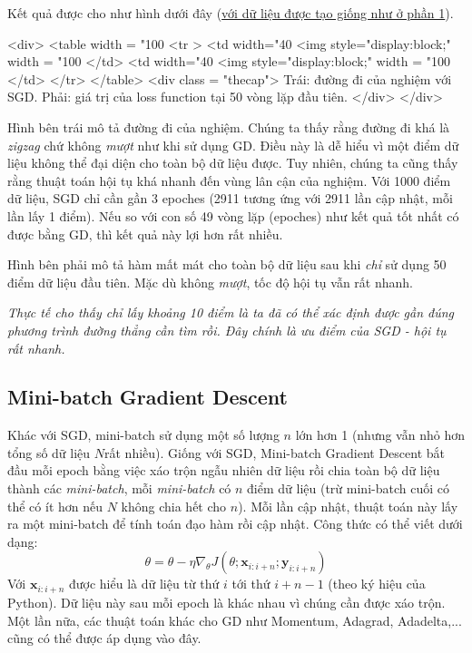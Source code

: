 Kết quả được cho như hình dưới đây (\href{http://machinelearningcoban.com/2017/01/12/gradientdescent/#quay-lai-voi-bai-toan-linear-regression}{với dữ liệu được tạo giống như ở phần 1}). 
 
<div> 
<table width = "100%
   <tr > 
        <td width="40%
        <img style="display:block;" width = "100%
         </td> 
        <td width="40%
        <img style="display:block;" width = "100%
        </td> 
    </tr> 
</table>  
<div class = "thecap"> Trái: đường đi của nghiệm với SGD. Phải: giá trị của loss function tại 50 vòng lặp đầu tiên. </div> 
</div> 
 
Hình bên trái mô tả đường đi của nghiệm. Chúng ta thấy rằng đường đi khá là \textit{zigzag} chứ không \textit{mượt} như khi sử dụng GD. Điều này là dễ hiểu vì một điểm dữ liệu không thể đại diện cho toàn bộ dữ liệu được. Tuy nhiên, chúng ta cũng thấy rằng thuật toán hội tụ khá nhanh đến vùng lân cận của nghiệm. Với 1000 điểm dữ liệu, SGD chỉ cần gần 3 epoches (2911 tương ứng với 2911 lần cập nhật, mỗi lần lấy 1 điểm). Nếu so với con số 49 vòng lặp (epoches) như kết quả tốt nhất có được bằng GD, thì kết quả này lợi hơn rất nhiều.  
 
Hình bên phải mô tả hàm mất mát cho toàn bộ dữ liệu sau khi \textit{chỉ} sử dụng 50 điểm dữ liệu đầu tiên. Mặc dù không \textit{mượt}, tốc độ hội tụ vẫn rất nhanh.  
 
\textit{Thực tế cho thấy chỉ lấy khoảng 10 điểm là ta đã có thể xác định được gần đúng phương trình đường thẳng cần tìm rồi. Đây chính là ưu điểm của SGD - hội tụ rất nhanh.} 
 
 
\subsection{Mini-batch Gradient Descent}
Khác với SGD, mini-batch sử dụng một số lượng $n$ lớn hơn 1 (nhưng vẫn nhỏ hơn tổng số dữ liệu $N$rất nhiều). Giống với SGD, Mini-batch Gradient Descent bắt đầu mỗi epoch bằng việc xáo trộn ngẫu nhiên dữ liệu rồi chia toàn bộ dữ liệu thành các \textit{mini-batch}, mỗi \textit{mini-batch} có $n$ điểm dữ liệu (trừ mini-batch cuối có thể có ít hơn nếu $N$ không chia hết cho $n$). Mỗi lần cập nhật, thuật toán này lấy ra một mini-batch để tính toán đạo hàm rồi cập nhật. Công thức có thể viết dưới dạng: 
\begin{equation*} 
\theta = \theta - \eta\nabla_{\theta} J(\theta; \mathbf{x}_{i:i+n}; \mathbf{y}_{i:i+n}) 
\end{equation*} 
Với $\mathbf{x}_{i:i+n}$ được hiểu là dữ liệu từ thứ $i$ tới thứ $i+n-1$ (theo ký hiệu của Python). Dữ liệu này sau mỗi epoch là khác nhau vì chúng cần được xáo trộn. Một lần nữa, các thuật toán khác cho GD như Momentum, Adagrad, Adadelta,... cũng có thể được áp dụng vào đây. 
 
